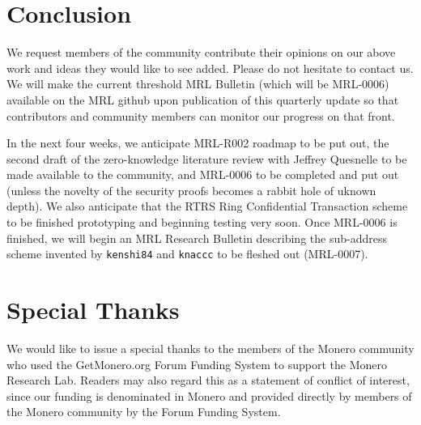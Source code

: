 \documentclass[12pt,english]{mrl}
\theoremstyle{definition}
\numberwithin{equation}{section}
\numberwithin{figure}{section}
\numberwithin{equation}{section}
\numberwithin{equation}{section}
\numberwithin{figure}{section}
\begin{document}
\section{Conclusion}

We request members of the community contribute their opinions on our above work and ideas they would like to see added. Please do not hesitate to contact us.  We will make the current threshold MRL Bulletin (which will be MRL-0006) available on the MRL github upon publication of this quarterly update so that contributors and community members can monitor our progress on that front. 

In the next four weeks, we anticipate MRL-R002 roadmap to be put out, the second draft of the zero-knowledge literature review with Jeffrey Quesnelle to be made available to the community, and MRL-0006 to be completed and put out (unless the novelty of the security proofs becomes a rabbit hole of uknown depth). We also anticipate that the RTRS Ring Confidential Transaction scheme to be finished prototyping and beginning testing very soon. Once MRL-0006 is finished, we will begin an MRL Research Bulletin describing the sub-address scheme invented by \texttt{kenshi84} and \texttt{knaccc} to be fleshed out (MRL-0007).




\section{Special Thanks} 

We would like to issue a special thanks to the members of the Monero community who used the GetMonero.org Forum Funding System to support the Monero Research Lab. Readers may also regard this as a statement of conflict of interest, since our funding is denominated in Monero and provided directly by members of the Monero community by the Forum Funding System.

\medskip{}



\end{document}
